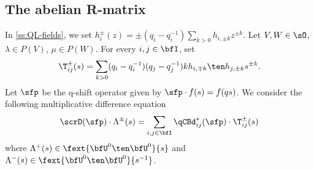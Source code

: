 \documentclass[reqno]{amsart}
\numberwithin{equation}{section}
\begin{document}
\subsection{The abelian R-matrix}\label{ss:abelian-R-matrix}
In \ref{ss:QL-fields}, we set
$h^{\pm}_i(z)=\pm(q_i-q_i^{-1})\sum_{k>0}h_{i,\pm k}z^{\pm k}$.
Let $V,W\in\sO$, $\lambda\in P(V)$, $\mu\in P(W)$. 
For every $i,j\in\bfI$, set
\begin{equation}\label{eq:Tij}
\T_{ij}^{\pm}(s)
=\sum_{k>0}(q_i-q_i^{-1})(q_j-q_j^{-1})kh_{i,\mp k}\ten h_{j, \pm k}s^{\pm k}.
\end{equation}
Let $\sfp$ be the q-shift operator given by $\sfp\cdot f(s)=f(qs)$. We consider the following multiplicative difference equation
\begin{equation}\label{eq:R-diff-eq}
\scrD(\sfp)\cdot\Lambda^{\pm}(s)=\sum_{i,j\in\bfI}\qCBd^*_{ij}(\sfp)\cdot\T_{ij}^{\pm}(s)
\end{equation}
where $\Lambda^+(s)\in\fext{\bfU^0\ten\bfU^0}{s}$ and $\Lambda^-(s)\in\fext{\bfU^0\ten\bfU^0}{s^{-1}}$.
\end{document}
